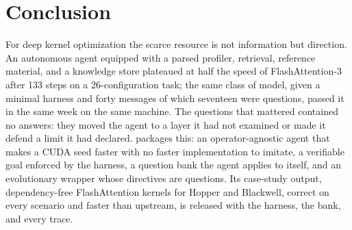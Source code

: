 \section{Conclusion}
\label{sec:conclusion}

For deep kernel optimization the scarce resource is not information but direction. An autonomous
agent equipped with a parsed profiler, retrieval, reference material, and a knowledge store
plateaued at half the speed of FlashAttention-3 after 133 steps on a 26-configuration task; the same
class of model, given a minimal harness and forty messages of which seventeen were questions, passed
it in the same week on the same machine. The questions that mattered contained no answers: they
moved the agent to a layer it had not examined or made it defend a limit it had declared. \sys packages this: an
operator-agnostic agent that makes a CUDA seed faster with no faster implementation to imitate, a
verifiable goal enforced by the harness, a question bank the agent applies to itself, and an
evolutionary wrapper whose directives are questions. Its case-study output, dependency-free FlashAttention kernels for Hopper and Blackwell, correct
on every scenario and faster than upstream, is released with the harness, the bank, and every
trace.
